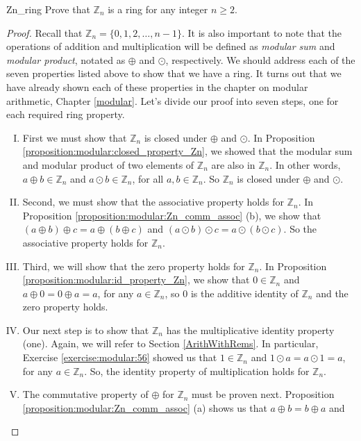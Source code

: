 \begin{example}{Zn_ring}
Prove that ${\mathbb Z}_n$ is a ring for any integer $n \ge 2$.

\begin{proof}
Recall that ${\mathbb Z}_n=\{0,1,2,\ldots,n-1\}$.  It is also important to note that the operations of addition and multiplication will be defined as \emph{modular sum} and \emph{modular product}, notated as $\oplus$ and $\odot$, respectively.  We should address each of the seven properties listed above to show that we have a ring.  It turns out that we have already shown each of these properties in the chapter on modular arithmetic, Chapter \ref{modular}.  Let's divide our proof into seven steps, one for each required ring property.
\begin{enumerate}[(I)]
\item First we must show that ${\mathbb Z}_n$ is closed under $\oplus$ and $\odot$.  In Proposition \ref{proposition:modular:closed_property_Zn}, we showed that the modular sum and modular product of two elements of  ${\mathbb Z}_n$ are also in ${\mathbb Z}_n$. In other words, $a\oplus b \in{\mathbb Z}_n$ and $a\odot b\in{\mathbb Z}_n$, for all $a,b\in{\mathbb Z}_n$.  So ${\mathbb Z}_n$ is closed under $\oplus$ and $\odot$.
\item Second, we must show that the associative property holds for ${\mathbb Z}_n$.  In Proposition \ref{proposition:modular:Zn_comm_assoc} (b), we show that $(a \oplus b) \oplus c  =  a \oplus (b \oplus c)$ and $(a \odot b) \odot c    =  a \odot (b \odot c)$.  So the associative property holds for ${\mathbb Z}_n$.
\item Third, we will show that the zero property holds for ${\mathbb Z}_n$. In Proposition \ref{proposition:modular:id_property_Zn}, we show that $0 \in {\mathbb Z}_n$ and $a\oplus 0=0\oplus a=a$, for any $a\in{\mathbb Z}_n$, so $0$ is the additive identity of ${\mathbb Z}_n$ and the zero property holds.
\item Our next step is to show that ${\mathbb Z}_n$ has the multiplicative identity property (one).  Again, we will refer to Section \ref{ArithWithRems}.  In particular, Exercise \ref{exercise:modular:56} showed us that $1\in{\mathbb Z}_n$ and $1\odot a=a\odot 1=a$, for any $a\in{\mathbb Z}_n$.  So, the identity property of multiplication holds for ${\mathbb Z}_n$.
\item The commutative property of $\oplus$ for ${\mathbb Z}_n$ must be proven next.  Proposition \ref{proposition:modular:Zn_comm_assoc} (a) shows us that $a \oplus b   =  b \oplus a$ and

\end{enumerate}
\end{proof}
\end{example}
